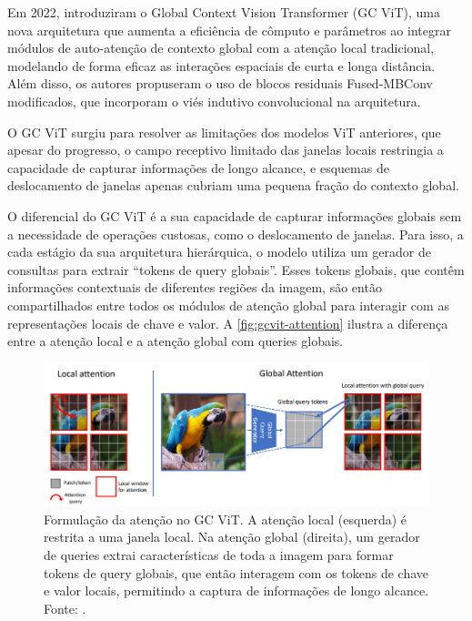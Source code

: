 Em 2022, \cite{gcvit2022} introduziram o Global Context Vision Transformer (GC ViT), uma nova arquitetura que aumenta a eficiência de cômputo e parâmetros ao integrar módulos de auto-atenção de contexto global com a atenção local tradicional, modelando de forma eficaz as interações espaciais de curta e longa distância. Além disso, os autores propuseram o uso de blocos residuais Fused-MBConv modificados, que incorporam o viés indutivo convolucional na arquitetura.

O GC ViT surgiu para resolver as limitações dos modelos ViT anteriores, que apesar do progresso, o campo receptivo limitado das janelas locais restringia a capacidade de capturar informações de longo alcance, e esquemas de deslocamento de janelas apenas cubriam uma pequena fração do contexto global.

O diferencial do GC ViT é a sua capacidade de capturar informações globais sem a necessidade de operações custosas, como o deslocamento de janelas. Para isso, a cada estágio da sua arquitetura hierárquica, o modelo utiliza um gerador de consultas para extrair ``tokens de query globais''. Esses tokens globais, que contêm informações contextuais de diferentes regiões da imagem, são então compartilhados entre todos os módulos de atenção global para interagir com as representações locais de chave e valor. A \autoref{fig:gcvit-attention} ilustra a diferença entre a atenção local e a atenção global com queries globais.

\begin{figure}[h]
    \centering
    \includegraphics[width=\linewidth]{figs/gcvit-attention.png}
    \caption{Formulação da atenção no GC ViT. A atenção local (esquerda) é restrita a uma janela local. Na atenção global (direita), um gerador de queries extrai características de toda a imagem para formar tokens de query globais, que então interagem com os tokens de chave e valor locais, permitindo a captura de informações de longo alcance. Fonte: \cite{gcvit2022}.}
    \label{fig:gcvit-attention}
\end{figure}

